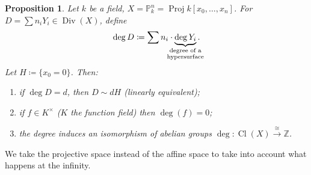 \documentclass[12pt]{article}
\DeclareMathOperator{\Proj}{Proj}
\DeclareMathOperator{\Div}{Div}
\DeclareMathOperator{\Cl}{Cl}
\newtheorem*{proposition}{Proposition}
\theoremstyle{definition}
\begin{document}
\begin{proposition}
Let $k$ be a field, $X=\mathbb{P}_k^n=\Proj k[x_0,\ldots,x_n]$. For $D=\sum n_iY_i\in\Div(X)$, define
\[\deg D\coloneqq\sum n_i\cdot\underbrace{\deg Y_i}_{\mathclap{\substack{\text{degree of a}\\\text{hypersurface}}}}.\]
Let $H\coloneqq\{x_0=0\}$. Then:
\begin{enumerate}[label=\arabic*)]
\item\label{linearly_equivalent} if $\deg D=d$, then $D\sim dH$ (linearly equivalent);
\item if $f\in K^{\times}$ ($K$ the function field) then $\deg(f)=0$;
\item the degree induces an isomorphism of abelian groups $\deg:\Cl(X)\xrightarrow{\cong}\mathbb{Z}$.
\end{enumerate}
\end{proposition}

We take the projective space instead of the affine space to take into account what happens at the infinity.
\end{document}
